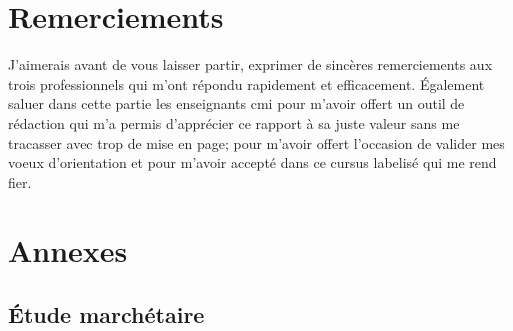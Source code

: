 \documentclass[12pt, a4paper]{report} %
\begin{document}
\chapter*{Remerciements}
J'aimerais avant de vous laisser partir, exprimer de sincères remerciements aux trois professionnels qui m'ont répondu rapidement et efficacement. Également saluer dans cette partie les enseignants \acrshort{cmi} pour m'avoir offert un outil de rédaction qui m'a permis d'apprécier ce rapport à sa juste valeur sans me tracasser avec trop de mise en page; pour m'avoir offert l'occasion de valider mes voeux d'orientation et pour m'avoir accepté dans ce cursus labelisé qui me rend fier.


\chapter*{Annexes}
\appendix
\label{appendix}
\section{Étude marchétaire}


\renewcommand{\bibname}{Sitographie}

\printglossary[title=List of Terms,toctitle=Termes et abréviations]
\label{glos}
\tableofcontents %
\end{document}
